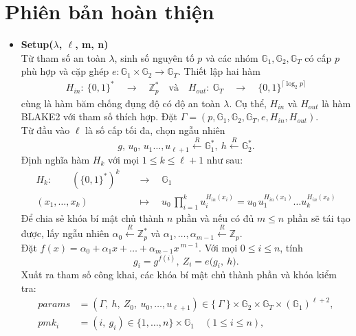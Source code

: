 \documentclass[class=report, crop=false]{standalone}
\begin{document}
	\section{Phiên bản hoàn thiện}
		\begin{itemize}[leftmargin=1cm, itemindent=-1cm]
			\item[] {\sffamily\bfseries Setup($\lambda$, $\ell$, m, n)} \\
			Từ tham số an toàn $\lambda$, sinh số nguyên tố $p$ và các nhóm $\mathbb{G}_1, \mathbb{G}_2, \mathbb{G}_T$ có cấp $p$ phù hợp và cặp ghép $e: \mathbb{G}_1 \times \mathbb{G}_2 \rightarrow \mathbb{G}_T$. Thiết lập hai hàm
			\begin{align*}
				H_{in}: 	\ \{0, 1 \}^* 	\quad \rightarrow \quad \mathbb{Z}_p^* 						\quad \text{và}\quad
				H_{out}: 	\ \mathbb{G}_T 	\quad \rightarrow \quad \{0, 1 \}^{\lceil \log_2 p \rceil}
			\end{align*}
			cùng là hàm băm chống đụng độ có độ an toàn $\lambda$. Cụ thể, $H_{in}$ và $H_{out}$ là hàm BLAKE2 với tham số thích hợp. Đặt $\Gamma = (p, \mathbb{G}_1, \mathbb{G}_2, \mathbb{G}_T, e, H_{in}, H_{out})$. \\
			Từ đầu vào $\ell$ là số cấp tối đa, chọn ngẫu nhiên
			\[
				g,\, u_0,\, u_1 \dots, u_{\ell + 1} \xleftarrow{R} \mathbb{G}_1^*,\ h \xleftarrow{R} \mathbb{G}_2^*.
			\]
			Định nghĩa hàm $H_k$ với mọi $1 \leq k \leq \ell + 1$ như sau:
			\begin{align*}
				H_k:\quad\quad 	(\{0, 1 \}^*)^k 	\quad	 &\rightarrow 	\quad  	\mathbb{G}_1 \\
								(x_1, \dots, x_k) 	\quad	 &\mapsto 		\quad  	u_0 \, \prod_{i = 1}^k u_i^{H_{in}(x_i)} = u_0 \, u_1^{H_{in}(x_1)}\dots u_k^{H_{in}(x_k)}
			\end{align*}
			Để chia sẻ khóa bí mật chủ thành $n$ phần và nếu có đủ $m \leq n$ phần sẽ tái tạo được, lấy ngẫu nhiên $\alpha_0 \xleftarrow{R} \mathbb{Z}_p^*$ và $\alpha_1, \dots, \alpha_{m - 1} \xleftarrow{R} \mathbb{Z}_p$. \\
			Đặt $f(x) = \alpha_0 + \alpha_1x + \dots + \alpha_{m - 1}x\,^{m - 1}$. Với mọi $0 \leq i \leq n$, tính
			\[
				g_i = g^{f(i)},\ Z_i = e \Big(g_i,\ h \Big).
			\]
			Xuất ra tham số công khai, các khóa bí mật chủ thành phần và khóa kiểm tra:
			\begin{align*}
				params &= (\Gamma,\ h,\ Z_0,\ u_0, \dots, u_{\ell + 1}) \in \{\ \Gamma \ \} \times \mathbb{G}_2 \times \mathbb{G}_T \times (\mathbb{G}_1)^{\ell + 2}, \\
				pmk_i &= (i,\ g_i) \in \{1, \dots, n \} \times \mathbb{G}_1 \quad (1 \leq i \leq n), \\

\end{align*}
\end{itemize}
\end{document}
